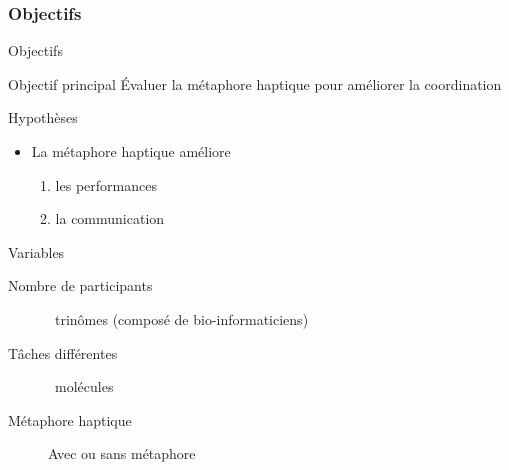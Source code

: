 \documentclass[english,french,dvips,10pt]{mybeamer}
\begin{document}
	\subsubsection{Objectifs}
	\begin{myframe}{Objectifs}
		\begin{myblock}{Objectif principal}
			Évaluer la métaphore haptique pour améliorer la coordination
		\end{myblock}
		\begin{myplusblock}{Hypothèses}
			\begin{itemize}
				\item La métaphore haptique améliore
					\begin{enumerate}
						\item les performances
						\item la communication
					\end{enumerate}
			\end{itemize}
		\end{myplusblock}
		\begin{myblock}{Variables}
			\begin{description}
				\item[Nombre de participants] ~trinômes (composé de bio-informaticiens)
				\item[Tâches différentes] ~molécules
				\item[Métaphore haptique] Avec ou sans métaphore
			\end{description}
		\end{myblock}
	\end{myframe}
\end{document}
